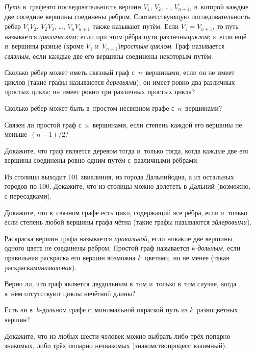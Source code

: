 \documentclass[a4paper,12pt]{article}
\begin{document}
\emph{Путь} в~графе\т это последовательность вершин $V_1$, $V_2$, \ldots, $V_{n+1}$, в~которой каждые две соседние вершины соединены ребром. Соответствующую последовательность рёбер $V_1V_2$, $V_2V_3$, \ldots, $V_nV_{n+1}$ также называют путём. Если $V_1=V_{n+1}$, то путь называется \emph{циклическим}; если при этом рёбра пути различны\т \emph{циклом}; а~если ещё и~вершины разные (кроме $V_1$ и~$V_{n+1}$)\т \emph{простым циклом}. Граф называется \emph{связным}, если каждые две его вершины соединены некоторым путём.

\vfill
{}

\newpage


Сколько рёбер может иметь связный граф с~$n$~вершинами, если
он не имеет циклов (такие графы называются \emph{деревьями});
он имеет ровно два различных простых цикла;
он имеет ровно три различных простых цикла?

Сколько рёбер может быть в~простом несвязном графе с~$n$~вершинами?

Связен ли простой граф с~$n$~вершинами, если степень каждой его вершины не меньше~$(n-1)/2$?

Докажите, что граф является деревом тогда и~только тогда, когда каждые две его вершины соединены ровно одним путём с~различными рёбрами.

Из столицы выходит 101 авиалиния, из города Дальний\т одна, а из остальных городов по 100. Докажите, что из столицы можно долететь в Дальний (возможно, с пересадками).

Докажите, что в~связном графе есть цикл, содержащий все рёбра, если и~только если степень любой вершины графа чётна (такие графы называются \emph{эйлеровыми}).

Раскраска вершин графа называется \emph{правильной}, если никакие две вершины одного цвета не соединены ребром. Простой граф называется \emph{$k$-дольным}, если правильная раскраска его вершин возможна $k$~цветами, но не менее (такая раскраска\т \emph{минимальная}).

Верно ли, что граф является двудольным в~том и~только в~том случае, когда в~нём отсутствуют циклы нечётной длины?

Есть ли в~$k$-дольном графе с~минимальной окраской путь из $k$~разноцветных вершин?

Докажите, что из любых шести человек можно выбрать либо трёх попарно знакомых, либо трёх попарно незнакомых (знакомство\т процесс взаимный).
\end{document}
